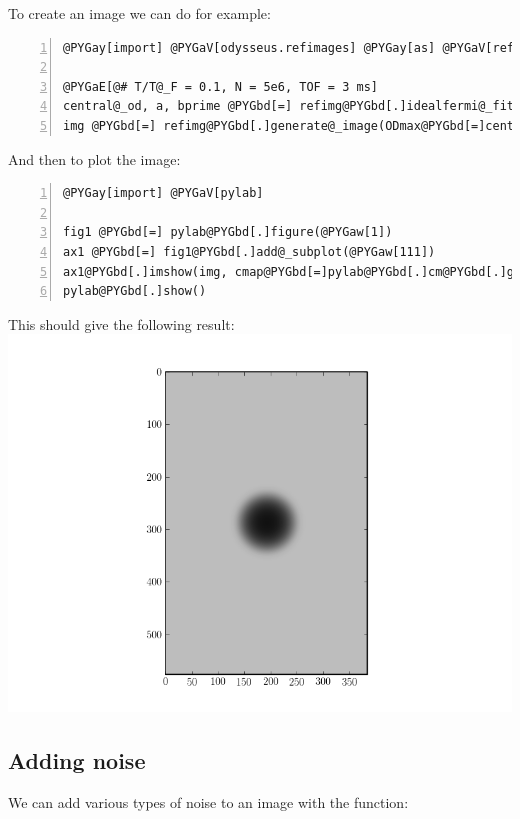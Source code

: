 \documentclass[letterpaper,10pt,english]{manual}
\begin{document}
To create an image we can do for example:

\begin{Verbatim}[commandchars=@\[\],numbers=left,firstnumber=1,stepnumber=1]
@PYGay[import] @PYGaV[odysseus.refimages] @PYGay[as] @PYGaV[refimg]

@PYGaE[@# T/T@_F = 0.1, N = 5e6, TOF = 3 ms]
central@_od, a, bprime @PYGbd[=] refimg@PYGbd[.]idealfermi@_fitparams(@PYGaw[0.1], @PYGaw[5e6], tof@PYGbd[=]@PYGaw[3e-3])
img @PYGbd[=] refimg@PYGbd[.]generate@_image(ODmax@PYGbd[=]central@_od, fugacity@PYGbd[=]a, cloudradius@PYGbd[=]bprime)
\end{Verbatim}

And then to plot the image:

\begin{Verbatim}[commandchars=@\[\],numbers=left,firstnumber=1,stepnumber=1]
@PYGay[import] @PYGaV[pylab]

fig1 @PYGbd[=] pylab@PYGbd[.]figure(@PYGaw[1])
ax1 @PYGbd[=] fig1@PYGbd[.]add@_subplot(@PYGaw[111])
ax1@PYGbd[.]imshow(img, cmap@PYGbd[=]pylab@PYGbd[.]cm@PYGbd[.]gray, vmin@PYGbd[=]@PYGaw[0], vmax@PYGbd[=]@PYGaw[1.35])
pylab@PYGbd[.]show()
\end{Verbatim}

This should give the following result:
\includegraphics[width=400pt]{refimg.png}

\subsection{Adding noise}

We can add various types of noise to an image with the  function:
\end{document}
